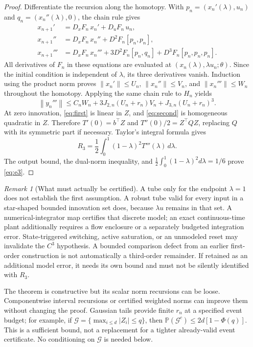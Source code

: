 \documentclass[11pt]{article}
\theoremstyle{remark}\newtheorem{remark}[theorem]{Remark}
\newcommand{\Prob}{\mathbb P}
\newcommand{\norm}[1]{\left\lVert#1\right\rVert}
\begin{document}
\begin{proof}
Differentiate the recursion along the homotopy. With
$p_n=(x_n'(\lambda),u_n)$ and $q_n=(x_n''(\lambda),0)$, the chain rule gives
\begin{align}
 x_{n+1}'&=D_xF_n\,x_n'+D_uF_n\,u_n,\label{eq:first}\\
 x_{n+1}''&=D_xF_n\,x_n''+D^2F_n[p_n,p_n],\label{eq:second}\\
 x_{n+1}'''&=D_xF_n\,x_n'''+3D^2F_n[p_n,q_n]
                                    +D^3F_n[p_n,p_n,p_n].\label{eq:third}
\end{align}
All derivatives of $F_n$ in these equations are evaluated at
$(x_n(\lambda),\lambda u_n;\theta)$. Since the initial condition is independent of $\lambda$, its three derivatives vanish. Induction using the product norm proves $\norm{x_n'}\le U_n$, $\norm{x_n''}\le V_n$, and $\norm{x_n'''}\le W_n$ throughout the homotopy. Applying the same chain rule to $H_n$ yields
\[
\norm{y_n'''}\le C_nW_n+3J_{2,n}(U_n+r_n)V_n
                              +J_{3,n}(U_n+r_n)^3.
\]
At zero innovation, \eqref{eq:first} is linear in $Z$, and \eqref{eq:second} is homogeneous quadratic in $Z$. Therefore $T'(0)=b^\top Z$ and $T''(0)/2=Z^\top QZ$, replacing $Q$ with its symmetric part if necessary. Taylor's integral formula gives
\[
R_3=\frac12\int_0^1(1-\lambda)^2T'''(\lambda)\,d\lambda.
\]
The output bound, the dual-norm inequality, and
$\frac12\int_0^1(1-\lambda)^2d\lambda=1/6$ prove \eqref{eq:e3}.
\end{proof}

\begin{remark}[What must actually be certified]\label{rem:obligations}
A tube only for the endpoint $\lambda=1$ does not establish the first assumption. A robust tube valid for every input in a star-shaped bounded innovation set does, because $\lambda u$ remains in that set. A numerical-integrator map certifies that discrete model; an exact continuous-time plant additionally requires a flow enclosure or a separately budgeted integration error. State-triggered switching, active saturation, or an unmodeled reset may invalidate the $C^3$ hypothesis. A bounded comparison defect from an earlier first-order construction is not automatically a third-order remainder. If retained as an additional model error, it needs its own bound and must not be silently identified with $R_3$.
\end{remark}

The theorem is constructive but its scalar norm recursions can be loose. Componentwise interval recursions or certified weighted norms can improve them without changing the proof. Gaussian tails provide finite $r_n$ at a specified event budget; for example, if $\mathcal G=\{\max_{i\le d}|Z_i|\le q\}$, then $\Prob(\mathcal G^c)\le2d[1-\Phi(q)]$. This is a sufficient bound, not a replacement for a tighter already-valid event certificate. No conditioning on $\mathcal G$ is needed below.
\end{document}
